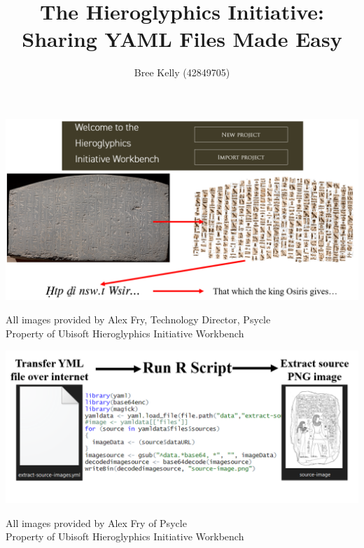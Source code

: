 \documentclass[unknownkeysallowed,usepdftitle=false, parskip=full]{beamer}
\title{The Hieroglyphics Initiative: Sharing YAML Files Made Easy}
\author{Bree Kelly (42849705)}
\institute{Ancient History Department, Macquarie University, Sydney}
\newcommand{\secvariable}{nothing}
\newcommand{\mysection}[1]{\renewcommand{\secvariable}{#1}
}
\begin{document}
\mysection{abstract}
\begin{frame}\label{\secvariable}


\begin{center}
\vspace{-0.5cm}
\includegraphics[width=1\textwidth,height=0.75\textheight,keepaspectratio]{figure/PICO_33.PNG}
\end{center}
\vfill
\parbox{\linewidth}{\tiny All images provided by Alex Fry, Technology Director, Psycle
\\Property of Ubisoft Hieroglyphics Initiative Workbench}

\end{frame}

\begin{frame}\label{\secvariable}

\begin{center}
\vfill
\includegraphics[width=1\textwidth,keepaspectratio]{figure/PICO_34.PNG}
\end{center}
\vfill
\parbox{\linewidth}{\tiny All images provided by Alex Fry of Psycle
\\Property of Ubisoft Hieroglyphics Initiative Workbench}

\end{frame}
\end{document}
